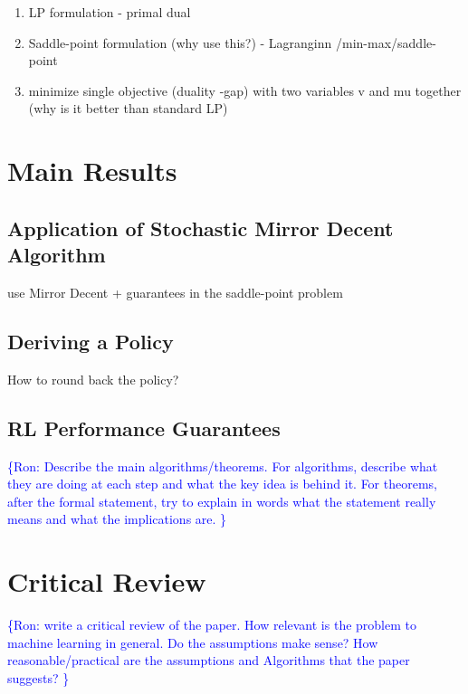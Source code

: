 \documentclass{article}
\newcommand{\ra}[1]{\textcolor{blue}{\{Ron: #1\}}}
\begin{document}
\begin{enumerate}
    \item  LP formulation - primal dual 
    \item Saddle-point formulation (why use this?) -  Lagranginn /min-max/saddle-point
    \item  minimize single objective (duality -gap) with two variables v and mu together (why is it better than standard LP) 
\end{enumerate}



\section{Main Results}

\subsection{Application of Stochastic Mirror Decent Algorithm}
 use Mirror Decent + guarantees in the saddle-point problem

\subsection{Deriving a Policy}
 How to  round back the policy?
 
\subsection{RL Performance Guarantees}


\ra{
Describe the main algorithms/theorems. For algorithms, describe what they
are doing at each step and what the key idea is behind it. For theorems, after the formal
statement, try to explain in words what the statement really means and what the
implications are.
}


\section{Critical Review}

\ra{
write a critical review of the paper. How relevant is the problem to machine
learning in general. Do the assumptions make sense? How reasonable/practical are the
assumptions and Algorithms that the paper suggests?
}
\end{document}
